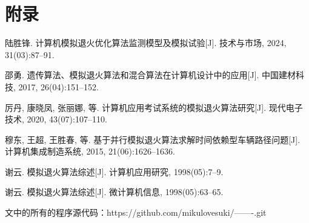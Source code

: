 \documentclass{article}
\begin{document}
\section*{附录}
\vspace{-1em}
\begin{thebibliography}{99}

陆胜锋. 计算机模拟退火优化算法监测模型及模拟试验[J]. 技术与市场, 2024, 31(03):87--91.

邵勇. 遗传算法、模拟退火算法和混合算法在计算机设计中的应用[J]. 中国建材科技, 2017, 26(04):151--152.

厉丹, 康晓凤, 张丽娜, 等. 计算机应用考试系统的模拟退火算法研究[J]. 现代电子技术, 2020, 43(07):107--110.

穆东, 王超, 王胜春, 等. 基于并行模拟退火算法求解时间依赖型车辆路径问题[J]. 计算机集成制造系统, 2015, 21(06):1626--1636.

谢云. 模拟退火算法综述[J]. 计算机应用研究, 1998(05):7--9.

谢云. 模拟退火算法综述[J]. 微计算机信息, 1998(05):63--65.

\end{thebibliography}

文中的所有的程序源代码：https://github.com/mikulovesuki/-------.git

\noindent
\end{document}
